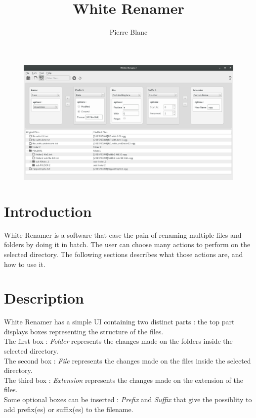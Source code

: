 \documentclass[10pt, a4paper]{scrartcl}
\title{\textbf{White Renamer}}
\date{}
\author{Pierre Blanc}
\begin{document}
\renewcommand{\labelitemi}{$\bullet$}

\maketitle
\setlength{\parindent}{0pt}
\begin{figure}[!h]
        \centering
        \includegraphics[width=1\textwidth]{MainLayout.png}
        \label{MainLayout}
\end{figure}
\break
\section{Introduction}
White Renamer is a software that ease the pain of renaming multiple files and folders by doing it in batch. The user can choose many actions to perform on the selected directory. The following sections describes what those actions are, and how to use it.

\section{Description}
White Renamer has a simple UI containing two distinct parts : the top part displays boxes representing the structure of the files. \\
The first box : \emph{Folder} represents the changes made on the folders inside the selected directory.\\
The second box : \emph{File} represents the changes made on the files inside the selected directory.\\
The third box : \emph{Extension} represents the changes made on the extension of the files.\\
Some optional boxes can be inserted : \emph{Prefix} and \emph{Suffix} that give the possiblity to add prefix(es) or suffix(es) to the filename.\\
\end{document}
